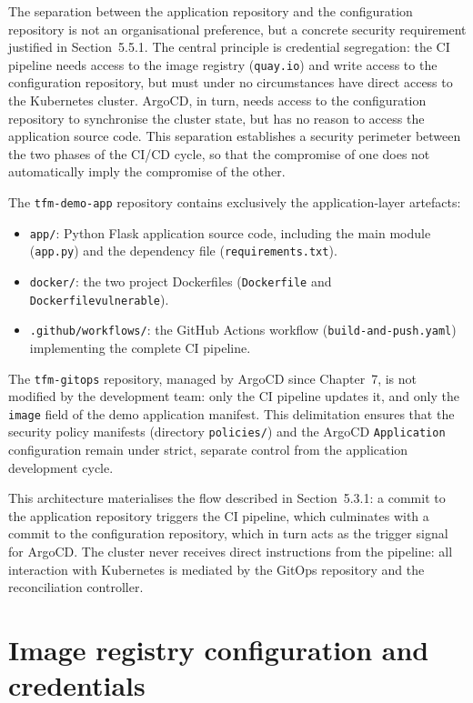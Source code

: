 The separation between the application repository and the configuration repository is not an organisational preference, but a concrete security requirement justified in Section~5.5.1. The central principle is credential segregation: the CI pipeline needs access to the image registry (\texttt{quay.io}) and write access to the configuration repository, but must under no circumstances have direct access to the Kubernetes cluster. ArgoCD, in turn, needs access to the configuration repository to synchronise the cluster state, but has no reason to access the application source code. This separation establishes a security perimeter between the two phases of the CI/CD cycle, so that the compromise of one does not automatically imply the compromise of the other.

The \texttt{tfm-demo-app} repository contains exclusively the application-layer artefacts:

\begin{itemize}
  \item \texttt{app/}: Python Flask application source code, including the main module (\texttt{app.py}) and the dependency file (\texttt{requirements.txt}).
  \item \texttt{docker/}: the two project Dockerfiles (\texttt{Dockerfile} and \texttt{Dockerfilevulnerable}).
  \item \texttt{.github/workflows/}: the GitHub Actions workflow (\texttt{build-and-push.yaml}) implementing the complete CI pipeline.
\end{itemize}

The \texttt{tfm-gitops} repository, managed by ArgoCD since Chapter~7, is not modified by the development team: only the CI pipeline updates it, and only the \texttt{image} field of the demo application manifest. This delimitation ensures that the security policy manifests (directory \texttt{policies/}) and the ArgoCD \texttt{Application} configuration remain under strict, separate control from the application development cycle.

This architecture materialises the flow described in Section~5.3.1: a commit to the application repository triggers the CI pipeline, which culminates with a commit to the configuration repository, which in turn acts as the trigger signal for ArgoCD. The cluster never receives direct instructions from the pipeline: all interaction with Kubernetes is mediated by the GitOps repository and the reconciliation controller.

\section{Image registry configuration and credentials}

